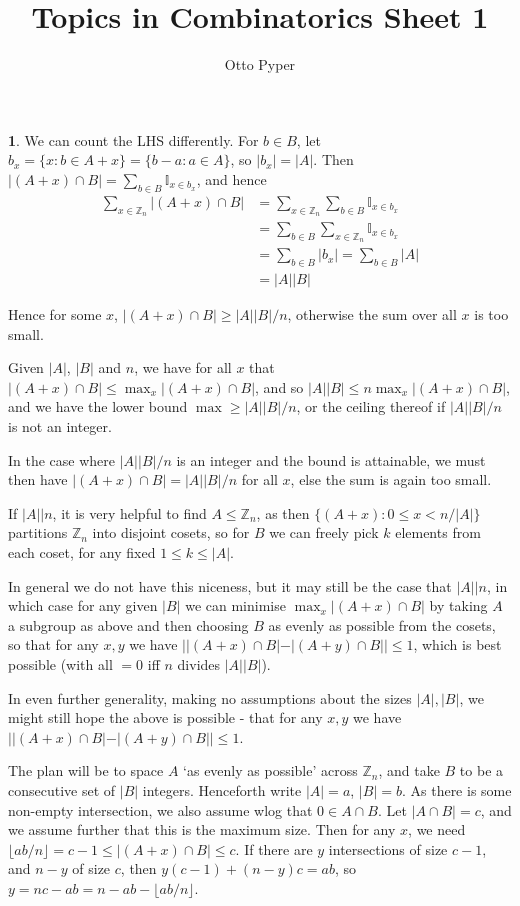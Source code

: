 \documentclass[]{article}
\title{Topics in Combinatorics Sheet 1}
\author{Otto Pyper}
\date{}
\theoremstyle{custhm}
\theoremstyle{cusdef}
\theoremstyle{custhm}
\theoremstyle{custhm}
\theoremstyle{custhm}
\theoremstyle{custhm}
\theoremstyle{cusdef}
\theoremstyle{remark}
\newcommand{\Z}{\mathbb{Z}}
\begin{document}
\maketitle
\clearpage

\textbf{1}. We can count the LHS differently. For $b\in B$, let $b_x = \{x:b\in A+x\} = \{b-a:a\in A\}$, so $|b_x| = |A|$. Then $|(A+x)\cap B| = \sum_{b\in B} \mathbb{I}_{x\in b_x}$, and hence
\begin{align*}
\sum_{x\in \Z_n} |(A+x)\cap B| &= \sum_{x\in \Z_n}\sum_{b\in B}\mathbb{I}_{x\in b_x}\\
&=\sum_{b\in B}\sum_{x\in \Z_n}\mathbb{I}_{x\in b_x}\\
&=\sum_{b\in B}|b_x| = \sum_{b\in B}|A|\\
&=|A||B|
\end{align*}

Hence for some $x$, $|(A+x)\cap B| \ge |A||B|/n$, otherwise the sum over all $x$ is too small.

Given $|A|$, $|B|$ and $n$, we have for all $x$ that $|(A+x)\cap B| \le \max_x |(A+x)\cap B|$, and so $|A||B| \le n\max_x |(A+x)\cap B|$, and we have the lower bound $\max \ge |A||B|/n$, or the ceiling thereof if $|A||B|/n$ is not an integer.

In the case where $|A||B|/n$ is an integer and the bound is attainable, we must then have $|(A+x)\cap B| = |A||B|/n$ for all $x$, else the sum is again too small.

If $|A| | n$, it is very helpful to find $A \le \Z_n$, as then $\{(A+x):0\le x < n/|A|\}$ partitions $\Z_n$ into disjoint cosets, so for $B$ we can freely pick $k$ elements from each coset, for any fixed $1\le k\le |A|$.

In general we do not have this niceness, but it may still be the case that $|A| | n$, in which case for any given $|B|$ we can minimise $\max_x|(A+x)\cap B|$ by taking $A$ a subgroup as above and then choosing $B$ as evenly as possible from the cosets, so that for any $x,y$ we have $||(A+x)\cap B| - |(A+y)\cap B|| \le 1$, which is best possible (with all $=0$ iff $n$ divides $|A||B|$).

In even further generality, making no assumptions about the sizes $|A|,|B|$, we might still hope the above is possible - that for any $x,y$ we have $||(A+x)\cap B| - |(A+y)\cap B|| \le 1$.

The plan will be to space $A$ `as evenly as possible' across $\Z_n$, and take $B$ to be a consecutive set of $|B|$ integers. Henceforth write $|A| = a$, $|B| = b$. As there is some non-empty intersection, we also assume wlog that $0\in A\cap B$. Let $|A\cap B| = c$, and we assume further that this is the maximum size. Then for any $x$, we need $\lfloor ab/n\rfloor = c-1\le |(A+x)\cap B| \le c$. If there are $y$ intersections of size $c-1$, and $n-y$ of size $c$, then $y(c-1) + (n-y)c = ab$, so $y = nc - ab = n - ab - \lfloor ab/n\rfloor$.
\end{document}
